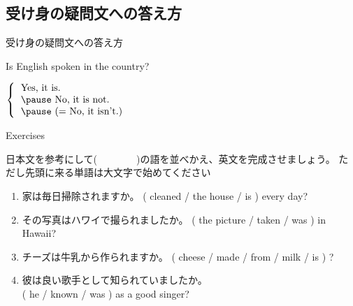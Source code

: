 \documentclass[aspectratio=169,xcolor={dvipsnames,table}]{beamer}
\newcommand{\myaudio}[1]{\href{#1}{\faVolumeUp}}
\begin{document}
\subsection{受け身の疑問文への答え方}
\begin{frame}[plain]{受け身の疑問文への答え方}
 \Large

Is English spoken in the country?

\vspace{20pt}
\pause

\mbox{}\hspace{100pt}$\left\{\begin{tabular}{ll}
         \text{Yes, it is.}&\\\pause
         \text{No, it is not.}&\\\pause
         \text{(}= \text{No, it isn't.)}&
        \end{tabular}\right.$



\end{frame}
\begin{frame}[plain]{Exercises}
 
日本文を参考にして(~~~~~~~~)の語を並べかえ、英文を完成させましょう。
ただし先頭に来る単語は大文字で始めてください\hfill\myaudio{./audio/051_passive_08.mp3}




\begin{enumerate}
 \item 家は毎日掃除されますか。
( cleaned / the house / is ) every day?\\
 \item その写真はハワイで撮られましたか。
( the picture / taken /  was ) in Hawaii?\\
 \item チーズは牛乳から作られますか。
( cheese / made / from / milk / is ) ?\\
 \item 彼は良い歌手として知られていましたか。\\
( he / known /  was ) as a good singer?\\
\end{enumerate}

\end{frame}
\end{document}
